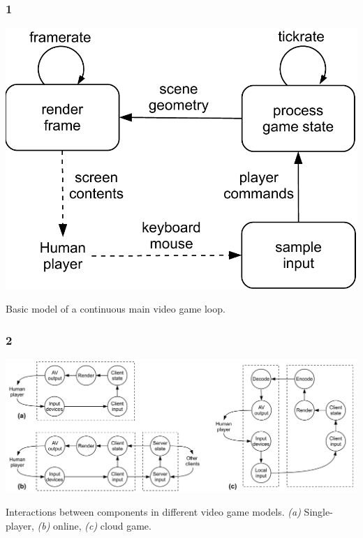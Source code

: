 \documentclass{UDEbeamerEN}
\begin{document}
\begin{frame}
	\frametitle{1}

	\begin{center}
		\includegraphics[width=.5\textwidth]{../../../models/game_loop.pdf}

		Basic model of a continuous main video game loop.
	\end{center}

\end{frame}

\begin{frame}
	\frametitle{2}

	\begin{center}

		\includegraphics[width=1.0\textwidth]{../../../models/component_interaction_full.pdf}

		Interactions between components in different video game models. \textit{(a)} Single-player, \textit{(b)} online, \textit{(c)} cloud game.
	\end{center}

\end{frame}
\end{document}
